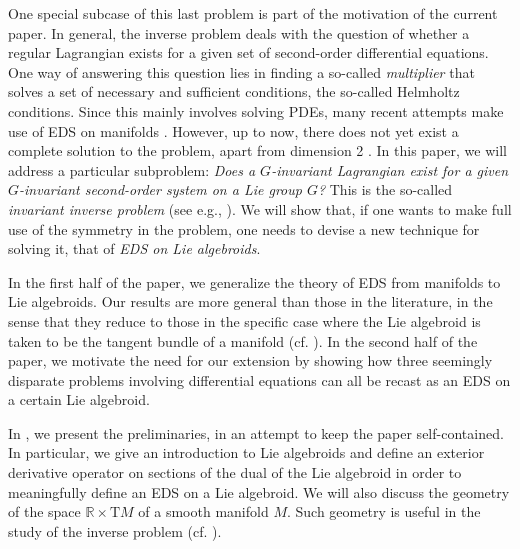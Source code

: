\documentclass[11pt]{article}
\theoremstyle{plain}
\theoremstyle{definition}
\begin{document}
One special subcase of this last problem is part of the motivation of the current paper. In general, the inverse problem deals with the question of whether a regular Lagrangian exists for a given set of second-order differential equations. One way of answering this question lies in finding a so-called \emph{multiplier} that solves a set of necessary and sufficient conditions, the so-called Helmholtz conditions. Since this mainly involves solving PDEs, many recent attempts make use of EDS on manifolds \cite{aldridge2003invprob,aldridge2,anderson1992invprob,do2016invprob,doprince}. However, up to now, there does not yet exist a complete solution to the problem, apart from dimension 2 \cite{Douglas}. In this paper, we will address a particular subproblem: \emph{Does a $G$-invariant Lagrangian exist for a given $G$-invariant second-order system on a Lie group $G$?} This is the so-called \emph{invariant inverse problem}  (see e.g., \cite{crampin2008invariantinv,muzsnay2005invariantinv}). We will show that, if one wants to make full use of the symmetry in the problem, one needs to devise a new technique for solving it, that of \emph{EDS on Lie algebroids}.

In the first half of the paper, we generalize the theory of EDS from manifolds to Lie algebroids. Our results are more general than those in the literature, in the sense that they reduce to those in the specific case where the Lie algebroid is taken to be the tangent bundle of a manifold (cf. \cite{bryant1991exterior,ivey2016cartan}). In the second half of the paper, we motivate the need for our extension by showing how three seemingly disparate problems involving differential equations can all be recast as an EDS on a certain Lie algebroid.

In , we present the preliminaries, in an attempt to keep the paper self-contained. In particular, we give an introduction to Lie algebroids and define an exterior derivative operator on sections of the dual of the Lie algebroid in order to meaningfully define an EDS on a Lie algebroid. We will also discuss the geometry of the space $\mathbb{R}\times \mathrm{T}M$ of a smooth manifold $M$. Such geometry is useful in the study of the inverse problem (cf. \cite{crampin1984geohelmholtz,krupkova2007jetbundles}).
\end{document}
